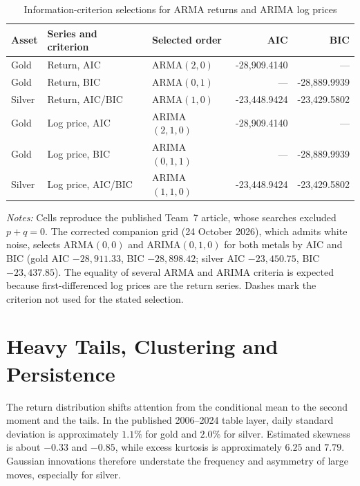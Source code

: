 \begin{table}[htbp]
\centering
\caption{Information-criterion selections for ARMA returns and ARIMA log prices}
\label{tab:t7-arma-arima-selection}
\small
\begin{tabular}{lllrr}
\toprule
Asset & Series and criterion & Selected order & AIC & BIC \\
\midrule
Gold   & Return, AIC      & ARMA$(2,0)$  & -28,909.4140 & --- \\
Gold   & Return, BIC      & ARMA$(0,1)$  & --- & -28,889.9939 \\
Silver & Return, AIC/BIC  & ARMA$(1,0)$  & -23,448.9424 & -23,429.5802 \\
Gold   & Log price, AIC   & ARIMA$(2,1,0)$ & -28,909.4140 & --- \\
Gold   & Log price, BIC   & ARIMA$(0,1,1)$ & --- & -28,889.9939 \\
Silver & Log price, AIC/BIC & ARIMA$(1,1,0)$ & -23,448.9424 & -23,429.5802 \\
\bottomrule
\end{tabular}
\begin{minipage}{0.94\textwidth}
\footnotesize\emph{Notes:} Cells reproduce the published Team~7 article,
whose searches excluded $p+q=0$. The corrected companion grid (24 October
2026), which admits white noise, selects ARMA$(0,0)$ and ARIMA$(0,1,0)$ for
both metals by AIC and BIC (gold AIC $-28{,}911.33$, BIC $-28{,}898.42$;
silver AIC $-23{,}450.75$, BIC $-23{,}437.85$). The equality of several ARMA
and ARIMA criteria is expected because first-differenced log prices are the
return series. Dashes mark the criterion not used for the stated selection.
\end{minipage}
\end{table}

\section{Heavy Tails, Clustering and Persistence}

The return distribution shifts attention from the conditional mean to the
second moment and the tails. In the published 2006--2024 table layer, daily standard deviation
is approximately $1.1\%$ for gold and $2.0\%$ for silver. Estimated skewness is
about $-0.33$ and $-0.85$, while excess kurtosis is approximately $6.25$ and
$7.79$. Gaussian innovations therefore understate the frequency and asymmetry
of large moves, especially for silver.

